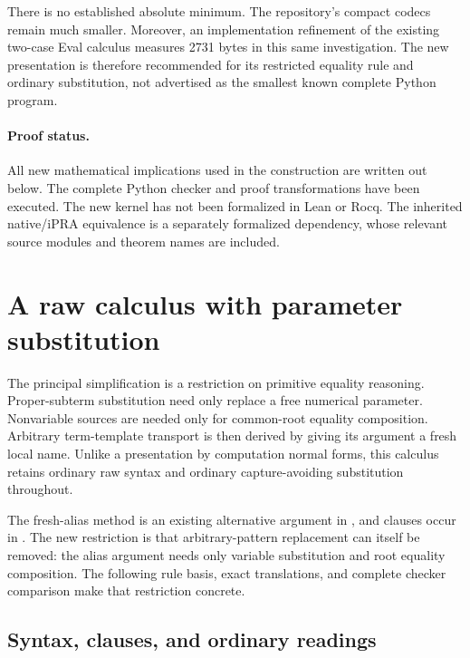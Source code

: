 \documentclass[11pt,letterpaper]{article}
\begin{document}
There is no established absolute minimum. The repository's compact
codecs remain much smaller. Moreover, an implementation refinement of
the existing two-case Eval calculus measures 2731 bytes in this same
investigation. The new presentation is therefore recommended for its
restricted equality rule and ordinary substitution, not advertised as
the smallest known complete Python program.

\paragraph{Proof status.}
All new mathematical implications used in the construction are written
out below. The complete Python checker and proof transformations have
been executed. The new kernel has not been formalized in Lean or Rocq.
The inherited native/iPRA equivalence is a separately formalized
dependency, whose relevant source modules and theorem names are included.



\section{A raw calculus with parameter substitution}
\label{sec:rp-spec}

The principal simplification is a restriction on primitive equality
reasoning.  Proper-subterm substitution need only replace a free numerical
parameter.  Nonvariable sources are needed only for common-root equality
composition.  Arbitrary term-template transport is then derived by giving
its argument a fresh local name.  Unlike a presentation by computation
normal forms, this calculus retains ordinary raw syntax and ordinary
capture-avoiding substitution throughout.

The fresh-alias method is an existing alternative argument in
\cite{templatefree}, and clauses occur in \cite{rawclausal}.  The new
restriction is that arbitrary-pattern replacement can itself be removed:
the alias argument needs only variable substitution and root equality
composition.  The following rule basis, exact translations, and complete
checker comparison make that restriction concrete.

\subsection{Syntax, clauses, and ordinary readings}
\end{document}
